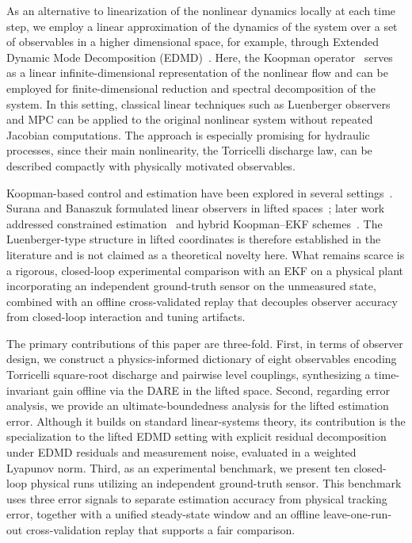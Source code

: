 \documentclass[asi,article,accept,pdftex,moreauthors]{Definitions/mdpi}
\begin{document}
As an alternative to linearization of the nonlinear dynamics locally at each time step, we employ a linear approximation of the dynamics of the system over a set of observables in a higher dimensional space, for example, through Extended Dynamic Mode Decomposition (EDMD)~\cite{williams2015,korda2018}. Here, the Koopman operator~\cite{koopman1931, mezic2005, brunton2016} serves as a linear infinite-dimensional representation of the nonlinear flow and can be employed for finite-dimensional reduction and spectral decomposition of the system. In this setting, classical linear techniques such as Luenberger observers and MPC can be applied to the original nonlinear system without repeated Jacobian computations. The approach is especially promising for hydraulic processes, since their main nonlinearity, the Torricelli discharge law, can be described compactly with physically motivated observables.


Koopman-based control and estimation have been explored in several settings~\cite{tellez2022,hernandez2026,aponte2025,DURANSIGUENZA2025,netto2018}. Surana and Banaszuk formulated linear observers in lifted spaces~\cite{surana2016}; later work addressed constrained estimation~\cite{Surana2017} and hybrid Koopman--EKF schemes~\cite{kiloekf2026}. {The Luenberger-type structure in lifted coordinates is therefore established in the literature and is not claimed as a theoretical novelty here. What remains scarce is a rigorous, closed-loop experimental comparison with an EKF on a physical plant incorporating an independent ground-truth sensor on the unmeasured state, combined with an offline cross-validated replay that decouples observer accuracy from closed-loop interaction and tuning artifacts.}

{The primary contributions of this paper are three-fold. First, in terms of observer design, we construct a physics-informed dictionary of eight observables encoding Torricelli square-root discharge and pairwise level couplings, synthesizing a time-invariant gain offline via the DARE in the lifted space. Second, regarding error analysis, we provide an ultimate-boundedness analysis for the lifted estimation error. Although it builds on standard linear-systems theory, its contribution is the specialization to the lifted EDMD setting with explicit residual decomposition under EDMD residuals and measurement noise, evaluated in a weighted Lyapunov norm. Third, as an experimental benchmark, we present ten closed-loop physical runs utilizing an independent ground-truth sensor. This benchmark uses three error signals to separate estimation accuracy from physical tracking error, together with a unified steady-state window and an offline leave-one-run-out cross-validation replay that supports a fair comparison.}
\end{document}
